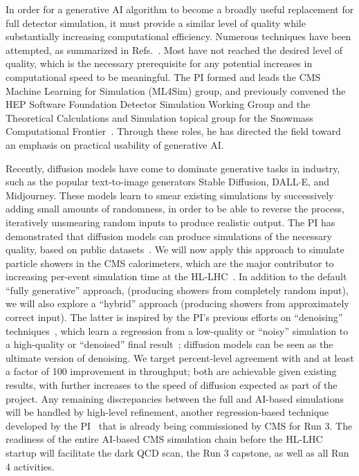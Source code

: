 In order for a generative AI algorithm to become a broadly useful replacement for full detector simulation,
it must provide a similar level of quality while substantially increasing computational efficiency.
Numerous techniques have been attempted, as summarized in Refs.~\cite{Adelmann:2022ozp,Hashemi:2023rgo}.
Most have not reached the desired level of quality, which is the necessary prerequisite for any potential increases in computational speed to be meaningful.
The PI formed and leads the CMS Machine Learning for Simulation (ML4Sim) group, and previously convened the HEP Software Foundation Detector Simulation Working Group
and the Theoretical Calculations and Simulation topical group for the Snowmass Computational Frontier~\cite{Boyle:2022cvo,Elvira:2022wyn}.
Through these roles, he has directed the field toward an emphasis on practical usability of generative AI.

Recently, diffusion models have come to dominate generative tasks in industry, such as the popular text-to-image generators Stable Diffusion, DALL${\cdot}$E, and Midjourney.
These models learn to smear existing simulations by successively adding small amounts of randomness,
in order to be able to reverse the process, iteratively unsmearing random inputs to produce realistic output.
The PI has demonstrated that diffusion models can produce simulations of the necessary quality, based on public datasets~\cite{Amram:2023onf}.
We will now apply this approach to simulate particle showers in the CMS calorimeters, which are the major contributor to increasing per-event simulation time at the HL-LHC~\cite{Pedro:2020kbk}.
In addition to the default ``fully generative'' approach, (producing showers from completely random input),
we will also explore a ``hybrid'' approach (producing showers from approximately correct input).
The latter is inspired by the PI's previous efforts on ``denoising'' techniques~\cite{Banerjee:2022gkg}, which learn a regression from a low-quality or ``noisy'' simulation to a high-quality or ``denoised'' final result~\cite{Pixar}; diffusion models can be seen as the ultimate version of denoising.
We target percent-level agreement with \GEANTfour and at least a factor of 100 improvement in throughput;
both are achievable given existing results, with further increases to the speed of diffusion expected as part of the project.
Any remaining discrepancies between the full and AI-based simulations will be handled by high-level refinement,
another regression-based technique developed by the PI~\cite{Bein:2023ylt} that is already being commissioned by CMS for Run 3.
The readiness of the entire AI-based CMS simulation chain before the HL-LHC startup will facilitate the dark QCD scan, the Run 3 capstone, as well as all Run 4 activities.

